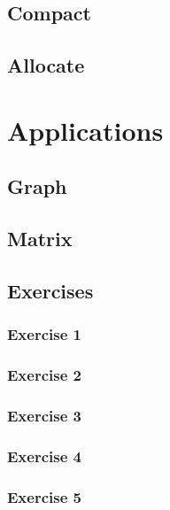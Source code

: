 \documentclass[12px,oz]{report}
\begin{document}
	\section{Compact}
	\label{sec-compact}
	
	
	\section{Allocate}
	\label{sec-allocate}
	

\chapter{Applications}
\label{ch-app}

	\section{Graph}
	\label{sec-graph}
	
	
	\section{Matrix}
	\label{sec-matrix}
	
	
	\section{Exercises}
	
		\subsection{Exercise 1}
		
		\subsection{Exercise 2}
		
		\subsection{Exercise 3}
		
		
		\subsection{Exercise 4}
		
		
		\subsection{Exercise 5}
		
\end{document}
